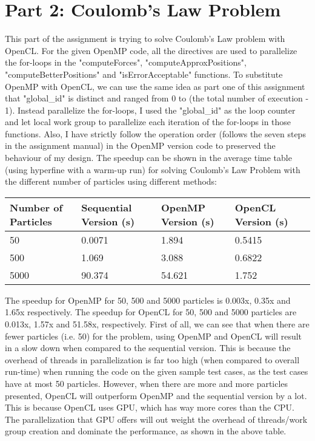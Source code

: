 \documentclass[12pt]{article}
\begin{document}
\section*{Part 2: Coulomb’s Law Problem}
\noindent
This part of the assignment is trying to solve Coulomb's Law problem with OpenCL. For the given OpenMP code, all the directives are used to parallelize the for-loops in the "computeForces", "computeApproxPositions", "computeBetterPositions" and "isErrorAcceptable" functions. To substitute OpenMP with OpenCL, we can use the same idea as part one of this assignment that "global\_id" is distinct and ranged from 0 to (the total number of execution - 1). Instead parallelize the for-loops, I used the "global\_id" as the loop counter and let local work group to parallelize each iteration of the for-loops in those functions. Also, I have strictly follow the operation order (follows the seven steps in the assignment manual) in the OpenMP version code to preserved the behaviour of my design. The speedup can be shown in the average time table (using hyperfine with a warm-up run) for solving Coulomb's Law Problem with the different number of particles using different methods:
\begin{center}
    \begin{tabular}{ | l | l | l | l | l |}
    \hline
    Number of Particles & Sequential Version (s) & OpenMP Version (s) & OpenCL Version (s) \\ 
    \hline
    50 & 0.0071 & 1.894 & 0.5415 \\ 
    \hline
    500 & 1.069 & 3.088 & 0.6822 \\ 
    \hline
    5000 & 90.374 & 54.621 & 1.752 \\ 
    
    \hline
    \end{tabular}
\end{center} 
\noindent
The speedup for OpenMP for 50, 500 and 5000 particles is 0.003x, 0.35x and 1.65x respectively. The speedup for OpenCL for 50, 500 and 5000 particles are 0.013x, 1.57x and 51.58x, respectively. First of all, we can see that when there are fewer particles (i.e. 50) for the problem, using OpenMP and OpenCL will result in a slow down when compared to the sequential version. This is because the overhead of threads in parallelization is far too high (when compared to overall run-time) when running the code on the given sample test cases, as the test cases have at most 50 particles. However, when there are more and more particles presented, OpenCL will outperform OpenMP and the sequential version by a lot. This is because OpenCL uses GPU, which has way more cores than the CPU. The parallelization that GPU offers will out weight the overhead of threads/work group creation and dominate the performance, as shown in the above table.   
\end{document}
